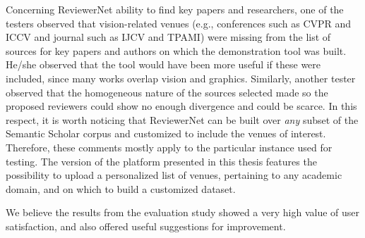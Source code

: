 Concerning ReviewerNet ability to find key papers and researchers, one of the testers observed that vision-related venues (e.g., conferences such as CVPR and ICCV and journal such as IJCV and TPAMI) were missing from the list of sources for key papers and authors on which the demonstration tool was built. He/she observed that the tool would have been more useful if these were included, since many works overlap vision and graphics. Similarly, another tester observed that the homogeneous nature of the sources selected made so the proposed reviewers could show no enough divergence and could be scarce. In this respect, it is worth noticing that ReviewerNet can be built over \emph{any} subset of the Semantic Scholar corpus and customized to include the venues of interest. Therefore, these comments mostly apply to the particular instance used for testing. The version of the platform presented in this thesis features the possibility to upload a personalized list of venues, pertaining to any academic domain, and on which to build a customized dataset. %


We believe the results from the evaluation study showed a very high value of user satisfaction, and also offered useful suggestions for improvement.




  




   

      